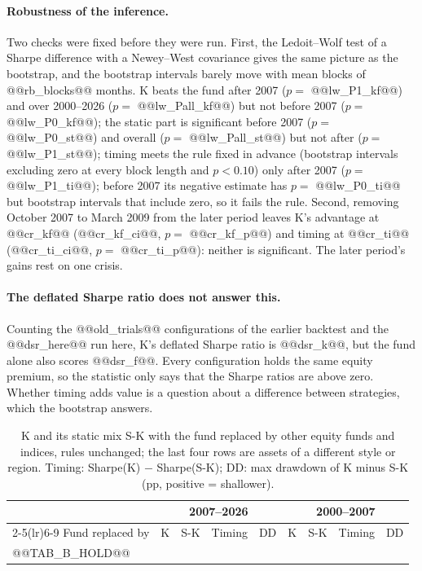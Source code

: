 \documentclass[11pt,a4paper]{article}
\begin{document}
\paragraph{Robustness of the inference.} Two checks were fixed before they were run. First, the Ledoit--Wolf
test of a Sharpe difference with a Newey--West covariance gives the same picture as the bootstrap, and the
bootstrap intervals barely move with mean blocks of @@rb_blocks@@ months. K beats the fund after 2007 ($p=$
@@lw_P1_kf@@) and over 2000--2026 ($p=$ @@lw_Pall_kf@@) but not before 2007 ($p=$ @@lw_P0_kf@@); the static part is
significant before 2007 ($p=$ @@lw_P0_st@@) and overall ($p=$ @@lw_Pall_st@@) but not after ($p=$ @@lw_P1_st@@);
timing meets the rule fixed in advance (bootstrap intervals excluding zero at every block length and $p<0.10$)
only after 2007 ($p=$ @@lw_P1_ti@@); before 2007 its negative estimate has $p=$ @@lw_P0_ti@@ but bootstrap intervals
that include zero, so it fails the rule. Second, removing October 2007 to March 2009 from the later period leaves K's advantage at
@@cr_kf@@ (@@cr_kf_ci@@, $p=$ @@cr_kf_p@@) and timing at @@cr_ti@@ (@@cr_ti_ci@@, $p=$ @@cr_ti_p@@): neither is
significant. The later period's gains rest on one crisis.

\paragraph{The deflated Sharpe ratio does not answer this.} Counting the @@old_trials@@ configurations of the
earlier backtest and the @@dsr_here@@ run here, K's deflated Sharpe ratio \citep{bailey2014} is @@dsr_k@@, but the
fund alone also scores @@dsr_f@@. Every configuration holds the same equity premium, so the statistic only says
that the Sharpe ratios are above zero. Whether timing adds value is a question about a difference between
strategies, which the bootstrap answers.

\begin{table}[htbp]
\centering
\caption{K and its static mix S-K with the fund replaced by other equity funds and indices, rules unchanged; the
last four rows are assets of a different style or region.
Timing: Sharpe(K) $-$ Sharpe(S-K); DD: max drawdown of K minus S-K (pp, positive = shallower).}
\label{tab:hold}
\footnotesize
\setlength{\tabcolsep}{3.5pt}
\begin{tabular}{@{}lrrrrrrrr@{}}
\toprule
& \multicolumn{4}{c}{2007--2026} & \multicolumn{4}{c}{2000--2007} \\
\cmidrule(lr){2-5}\cmidrule(lr){6-9}
Fund replaced by & K & S-K & Timing & DD & K & S-K & Timing & DD \\
\midrule
@@TAB_B_HOLD@@
\bottomrule
\end{tabular}
\end{table}
\end{document}
